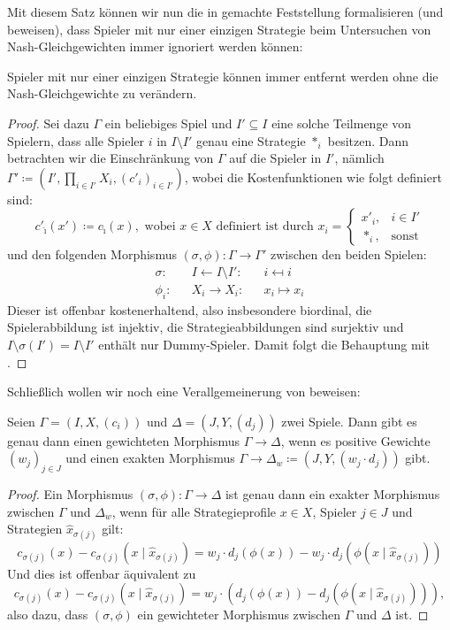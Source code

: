 Mit diesem Satz können wir nun die in  gemachte Feststellung formalisieren (und beweisen), dass Spieler mit nur einer einzigen Strategie beim Untersuchen von Nash-Gleichgewichten immer ignoriert werden können:

\begin{kor}\label{kor:EinStratSpielerWeglassen}
	Spieler mit nur einer einzigen Strategie können immer entfernt werden ohne die Nash-Gleichgewichte zu verändern.
\end{kor}

\begin{proof}
	Sei dazu $\Gamma$ ein beliebiges Spiel und $I' \subseteq I$ eine solche Teilmenge von Spielern, dass alle Spieler $i$ in $I \setminus I'$ genau eine Strategie $\ast_i$ besitzen. Dann betrachten wir die Einschränkung von $\Gamma$ auf die Spieler in $I'$, nämlich $\Gamma' \coloneqq (I', \prod_{i \in I'}X_i, (c'_i)_{i \in I'})$, wobei die Kostenfunktionen wie folgt definiert sind:
		\[c'_{\hat{\imath}}(x') \coloneqq c_{\hat{\imath}}(x), \text{ wobei $x \in X$ definiert ist durch } x_i = \begin{cases}x'_i, &i \in I'\\ \ast_i, &\text{sonst}\end{cases}\]
	und den folgenden Morphismus $(\sigma, \phi): \Gamma \to \Gamma'$ zwischen den beiden Spielen:
	\begin{align*}
		\sigma:	&&I		\leftarrow	I\setminus I':	&&i		\mapsfrom	i  \\
		\phi_i:	&&X_i	\to	 		X_i:			&&x_i	\mapsto		x_i
	\end{align*}	
	Dieser ist offenbar kostenerhaltend, also insbesondere biordinal, die Spielerabbildung ist injektiv, die Strategieabbildungen sind surjektiv und $I\setminus \sigma(I') = I \setminus I'$ enthält nur Dummy-Spieler. Damit folgt die Behauptung mit .
\end{proof}

Schließlich wollen wir noch eine Verallgemeinerung von  beweisen:

\begin{lemma}
	Seien $\Gamma = (I, X, (c_i))$ und $\Delta = (J, Y, (d_j))$ zwei Spiele. Dann gibt es genau dann einen gewichteten Morphismus $\Gamma \to \Delta$, wenn es positive Gewichte $(w_j)_{j\in J}$ und einen exakten Morphismus $\Gamma \to \Delta_w \coloneqq (J, Y, (w_j\cdot d_j))$ gibt.
\end{lemma}

\begin{proof}
	Ein Morphismus $(\sigma, \phi): \Gamma \to \Delta$ ist genau dann ein exakter Morphismus zwischen $\Gamma$ und $\Delta_w$, wenn für alle Strategieprofile $x \in X$, Spieler $j \in J$ und Strategien $\hat{x}_{\sigma(j)}$ gilt:
		\[c_{\sigma(j)}(x) - c_{\sigma(j)}(x \mid \hat{x}_{\sigma(j)}) = w_j \cdot d_j(\phi(x)) - w_j \cdot d_j(\phi(x \mid \hat{x}_{\sigma(j)}))\]
	Und dies ist offenbar äquivalent zu
		\[c_{\sigma(j)}(x) - c_{\sigma(j)}(x \mid \hat{x}_{\sigma(j)}) = w_j \cdot \left(d_j(\phi(x)) - d_j(\phi(x \mid \hat{x}_{\sigma(j)}))\right),\]
	also dazu, dass $(\sigma, \phi)$ ein gewichteter Morphismus zwischen $\Gamma$ und $\Delta$ ist.
\end{proof}
